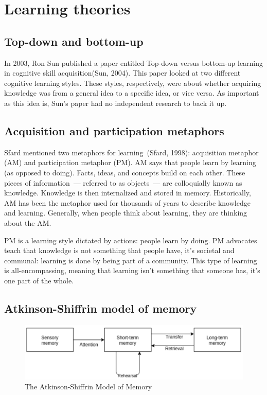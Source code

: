 \section{Learning theories}
\subsection{Top-down and bottom-up}
In 2003, Ron Sun published a paper entitled Top-down versus bottom-up learning in cognitive skill acquisition(Sun, 2004). This paper looked at two different cognitive learning styles. These styles, respectively, were about whether acquiring knowledge was from a general idea to a specific idea, or vice versa. As important as this idea is, Sun's paper had no independent research to back it up.

\subsection{Acquisition and participation metaphors}
Sfard mentioned two metaphors for learning~(Sfard, 1998): acquisition metaphor (AM) and participation metaphor (PM). AM says that people learn by learning (as opposed to doing). Facts, ideas, and concepts build on each other. These pieces of information~--- referred to as objects~--- are colloquially known as knowledge. Knowledge is then internalized and stored in memory. Historically, AM has been the metaphor used for thousands of years to describe knowledge and learning. Generally, when people think about learning, they are thinking about the AM.

PM is a learning style dictated by actions: people learn by doing. PM advocates teach that knowledge is not something that people have, it's societal and communal: learning is done by being part of a community. This type of learning is all-encompassing, meaning that learning isn't something that someone has, it's one part of the whole.

\subsection{Atkinson-Shiffrin model of memory}
\begin{figure}
  \centering
  \includegraphics[width=\textwidth]{figures/chapter2/atkinson-model-of-memory.png}
  \caption{The Atkinson-Shiffrin Model of Memory}
  \label{fig:atkinson-model-of-memory}
\end{figure}


